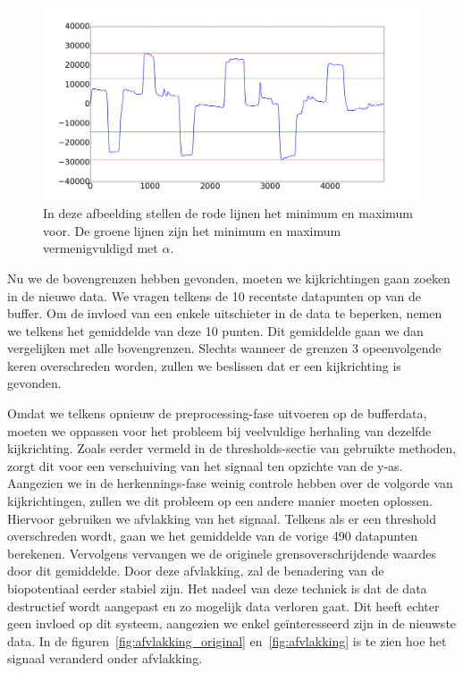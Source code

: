 \documentclass{article}
\begin{document}
\begin{figure}[h]
\centering
\includegraphics[width=\linewidth]{images/thresholds_distribution}
\caption{In deze afbeelding stellen de rode lijnen het minimum en maximum voor. De groene lijnen zijn het minimum en maximum vermenigvuldigd met $\alpha$.}
\label{fig:maxminthresholds}
\end{figure}

Nu we de bovengrenzen hebben gevonden, moeten we kijkrichtingen gaan zoeken in de nieuwe data. We vragen telkens de 10 recentste datapunten op van de buffer. Om de invloed van een enkele uitschieter in de data te beperken, nemen we telkens het gemiddelde van deze 10 punten. Dit gemiddelde gaan we dan vergelijken met alle bovengrenzen. Slechts wanneer de grenzen 3 opeenvolgende keren overschreden worden, zullen we beslissen dat er een kijkrichting is gevonden.

Omdat we telkens opnieuw de preprocessing-fase uitvoeren op de bufferdata, moeten we oppassen voor het probleem bij veelvuldige herhaling van dezelfde kijkrichting. Zoals eerder vermeld in de thresholds-sectie van gebruikte methoden, zorgt dit voor een verschuiving van het signaal ten opzichte van de y-as. Aangezien we in de herkennings-fase weinig controle hebben over de volgorde van kijkrichtingen, zullen we dit probleem op een andere manier moeten oplossen. Hiervoor gebruiken we afvlakking van het signaal. Telkens als er een threshold overschreden wordt, gaan we het gemiddelde van de vorige 490 datapunten berekenen. Vervolgens vervangen we de originele grensoverschrijdende waardes door dit gemiddelde. Door deze afvlakking, zal de benadering van de biopotentiaal eerder stabiel zijn. Het nadeel van deze techniek is dat de data destructief wordt aangepast en zo mogelijk data verloren gaat. Dit heeft echter geen invloed op dit systeem, aangezien we enkel geïnteresseerd zijn in de nieuwste data. In de figuren~\ref{fig:afvlakking_original} en~\ref{fig:afvlakking} is te zien hoe het signaal veranderd onder afvlakking.
\end{document}
